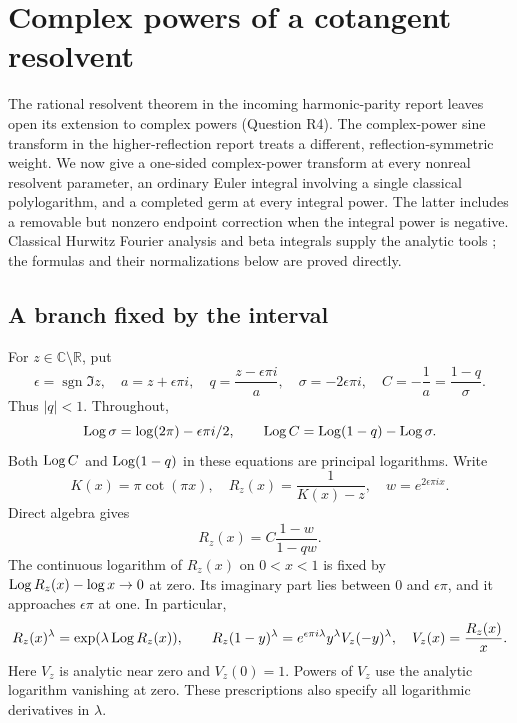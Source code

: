 \section{Complex powers of a cotangent resolvent}
\label{power:sec}

The rational resolvent theorem in the incoming harmonic-parity report
leaves open its extension to complex powers (Question R4).  The
complex-power sine transform in the higher-reflection report treats a
different, reflection-symmetric weight.  We now give a one-sided
complex-power transform at every nonreal resolvent parameter, an ordinary
Euler integral involving a single classical polylogarithm, and a completed
germ at every integral power.  The latter includes a removable but
nonzero endpoint correction when the integral power is negative.
Classical Hurwitz Fourier analysis and beta integrals supply the analytic
tools \cite{DLMF,EspinosaMoll}; the formulas and their
normalizations below are proved directly.

\subsection{A branch fixed by the interval}

For $z\in\mathbb C\setminus\mathbb R$, put
\begin{equation}\label{power:coordinates}
 \epsilon=\operatorname{sgn}\Im z,\quad
 a=z+\epsilon\pi i,\quad q=\frac{z-\epsilon\pi i}{a},\quad
 \sigma=-2\epsilon\pi i,\quad C=-\frac1a=\frac{1-q}{\sigma}.
\end{equation}
Thus $|q|<1$.  Throughout,
\[
 \operatorname{Log}\sigma=\log(2\pi)-\epsilon\pi i/2,
 \qquad \operatorname{Log} C=\operatorname{Log}(1-q)-\operatorname{Log}\sigma.
\]
Both $\operatorname{Log} C$ and $\operatorname{Log}(1-q)$ in these equations are principal
logarithms.  Write
\begin{equation}\label{power:R}
 K(x)=\pi\cot(\pi x),\quad R_z(x)=\frac1{K(x)-z},\quad
 w=e^{2\epsilon\pi ix}.
\end{equation}
Direct algebra gives
\begin{equation}\label{power:factor}
 R_z(x)=C\frac{1-w}{1-qw}.
\end{equation}
The continuous logarithm of $R_z(x)$ on $0<x<1$ is fixed by
$\operatorname{Log} R_z(x)-\log x\to0$ at zero.  Its imaginary part lies between
$0$ and $\epsilon\pi$, and it approaches $\epsilon\pi$ at one.
In particular,
\begin{equation}\label{power:branches}
 R_z(x)^\lambda=\exp(\lambda\operatorname{Log} R_z(x)),\qquad
 R_z(1-y)^\lambda=e^{\epsilon\pi i\lambda}y^\lambda
                       V_z(-y)^\lambda,
 \quad V_z(x)=\frac{R_z(x)}x.
\end{equation}
Here $V_z$ is analytic near zero and $V_z(0)=1$.  Powers of $V_z$
use the analytic logarithm vanishing at zero.  These prescriptions also
specify all logarithmic derivatives in $\lambda$.

